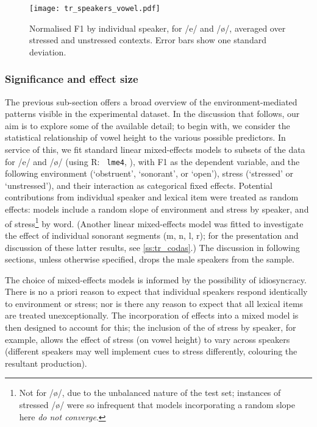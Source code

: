 \begin{figure}[H]
  \texttt{[image: tr\_speakers\_vowel.pdf]}
  \caption[Normalised F1 by individual speaker, for /e/ and /ø/.]{Normalised F1 by individual speaker, for /e/ and /ø/, averaged over stressed and unstressed contexts. Error bars show one standard deviation.}
  \label{fig:tr_speakers_individual}
\end{figure}

\subsubsection{Significance and effect size}

The previous sub-section offers a broad overview of the environment-mediated patterns visible in the experimental dataset. In the discussion that follows, our aim is to explore some of the available detail; to begin with, we consider the statistical relationship of vowel height to the various possible predictors. In service of this, we fit standard linear mixed-effects models to subsets of the data for /e/ and /\o/ (using R: \texttt{ lme4}, \citealt{lme4}), with F1 as the dependent variable, and the following environment (`obstruent', `sonorant', or `open'), stress (`stressed' or `unstressed'), and their interaction as categorical fixed effects. Potential contributions from individual speaker and lexical item were treated as random effects: models include a random slope of environment and stress by speaker, and of stress\footnote{Not for /ø/, due to the unbalanced nature of the test set; instances of stressed /ø/ were so infrequent that models incorporating a random slope here \emph{do not converge}.} by word. (Another linear mixed-effects model was fitted to investigate the effect of individual sonorant segments (m, n, l, r); for the presentation and discussion of these latter results, see \cref{ss:tr_codas}.) The discussion in following sections, unless otherwise specified, drops the male speakers from the sample.

The choice of mixed-effects models is informed by the possibility of idiosyncracy. There is no a priori reason to expect that individual speakers respond identically to environment or stress; nor is there any reason to expect that all lexical items are treated unexceptionally. The incorporation of  effects into a mixed model is then designed to account for this; the inclusion of the  of stress by speaker, for example, allows the effect of stress (on vowel height) to vary across speakers (different speakers may well implement cues to stress differently, colouring the resultant production).

